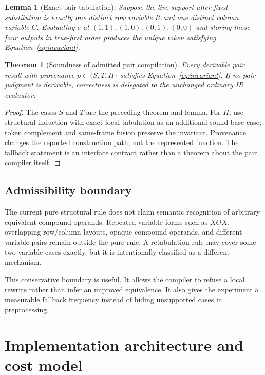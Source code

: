 \documentclass[10pt]{article}
\theoremstyle{plain}
\newtheorem{theorem}{Theorem}
\newtheorem{lemma}{Lemma}
\theoremstyle{definition}
\theoremstyle{remark}
\begin{document}
\begin{lemma}[Exact pair tabulation]
Suppose the live support after fixed substitution is exactly one distinct row variable $R$ and one distinct column variable $C$. Evaluating $e$ at $(1,1),(1,0),(0,1),(0,0)$ and storing those four outputs in true-first order produces the unique token satisfying Equation~\eqref{eq:invariant}.
\end{lemma}

\begin{theorem}[Soundness of admitted pair compilation]
Every derivable pair result with provenance $p\in\{S,T,H\}$ satisfies Equation~\eqref{eq:invariant}. If no pair judgment is derivable, correctness is delegated to the unchanged ordinary IR evaluator.
\end{theorem}

\begin{proof}
The cases $S$ and $T$ are the preceding theorem and lemma. For $H$, use structural induction with exact local tabulation as an additional sound base case; token complement and same-frame fusion preserve the invariant. Provenance changes the reported construction path, not the represented function. The fallback statement is an interface contract rather than a theorem about the pair compiler itself.
\end{proof}

\subsection{Admissibility boundary}

The current pure structural rule does not claim semantic recognition of arbitrary equivalent compound operands. Repeated-variable forms such as $X\Theta X$, overlapping row/column layouts, opaque compound operands, and different variable pairs remain outside the pure rule. A retabulation rule may cover some two-variable cases exactly, but it is intentionally classified as a different mechanism.

This conservative boundary is useful. It allows the compiler to refuse a local rewrite rather than infer an unproved equivalence. It also gives the experiment a measurable fallback frequency instead of hiding unsupported cases in preprocessing.

\section{Implementation architecture and cost model}
\label{sec:implementation}
\end{document}
